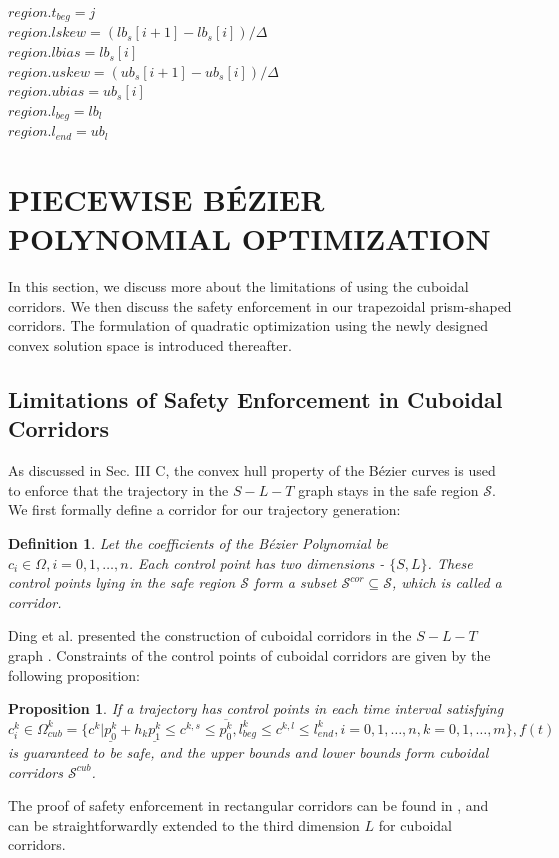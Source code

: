 \documentclass[journal,a4paper,onecolumn,12pt]{IEEEtran}
\newtheorem{definition}{Definition}
\newtheorem{proposition}{Proposition}
\begin{document}
\begin{algorithm}[htbp]
\caption{Single Region Caculate}
\setcounter{AlgoLine}{0}
\LinesNumbered
{}
 $region.t_{beg} = j$\\
 $region.lskew = (lb_s[i + 1] - lb_s[i])/\Delta$\\
 $region.lbias = lb_s[i]$\\
 $region.uskew = (ub_s[i + 1] - ub_s[i])/\Delta$\\
 $region.ubias = ub_s[i]$\\
 $region.l_{beg} = lb_l$\\
 $region.l_{end} = ub_l$\\
\end{algorithm}

\section{PIECEWISE B\'{E}ZIER POLYNOMIAL OPTIMIZATION}
In this section, we discuss more about the limitations of using the cuboidal corridors. We then discuss the safety enforcement in our trapezoidal prism-shaped corridors. The formulation of quadratic optimization using the newly designed convex solution space is introduced thereafter.

\subsection{Limitations of Safety Enforcement in Cuboidal Corridors}
As discussed in Sec. III C, the convex hull property of the B\'{e}zier curves is used to enforce that the trajectory in the $S-L-T$ graph stays in the safe region $\mathcal{S}$. We first formally define a corridor for our trajectory generation:

\begin{definition}
\textit{Let the coefficients of the B\'{e}zier Polynomial be $c_i \in \Omega, i=0,1,\ldots,n$. Each control point has two dimensions - $\{S, L\}$. These control points lying in the safe region $\mathcal{S}$ form a subset $\mathcal{S}^{cor} \subseteq \mathcal{S}$, which is called a corridor.}
\end{definition}

Ding et al. presented the construction of cuboidal corridors in the $S-L-T$ graph \cite{ding_safe_2019}. Constraints of the control points of cuboidal corridors are given by the following proposition:

\begin{proposition}
If a trajectory has control points in each time interval satisfying $c^{k}_i \in \Omega^{k}_{cub} = \{c^k | \underline{p_{0}^{k}}+h_{k} \underline{p_{1}^{k}} \leq c^{k,s} \leq \overline{p_{0}^{k}}, l^{k}_{beg} \leq c^{k,l} \leq l^{k}_{end}, i=0,1,\ldots,n, k=0,1,\ldots,m\}, f(t)$ is guaranteed to be safe, and the upper bounds and lower bounds form cuboidal corridors $\mathcal{S}^{cub}$.
\end{proposition}
The proof of safety enforcement in rectangular corridors can be found in \cite{li_motion_nodate}, and can be straightforwardly extended to the third dimension $L$ for cuboidal corridors.
\end{document}
